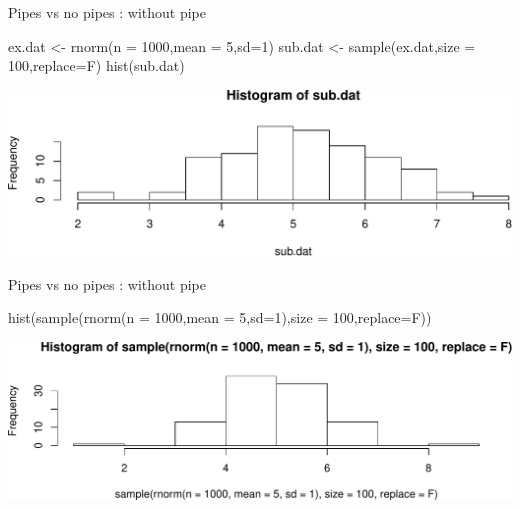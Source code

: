 \documentclass[14pt,ignorenonframetext,]{bredelebeamer}
\newenvironment{Shaded}{\begin{snugshade}}{\end{snugshade}}
\newcommand{\KeywordTok}[1]{\textcolor[rgb]{0.94,0.87,0.69}{#1}}
\newcommand{\DataTypeTok}[1]{\textcolor[rgb]{0.87,0.87,0.75}{#1}}
\newcommand{\DecValTok}[1]{\textcolor[rgb]{0.86,0.86,0.80}{#1}}
\newcommand{\StringTok}[1]{\textcolor[rgb]{0.80,0.58,0.58}{#1}}
\newcommand{\NormalTok}[1]{\textcolor[rgb]{0.80,0.80,0.80}{#1}}
\begin{document}
\begin{frame}[fragile]{Pipes vs no pipes : without pipe}

\begin{Shaded}
\begin{Highlighting}[]
\NormalTok{ex.dat <-}\StringTok{ }\KeywordTok{rnorm}\NormalTok{(}\DataTypeTok{n =} \DecValTok{1000}\NormalTok{,}\DataTypeTok{mean =} \DecValTok{5}\NormalTok{,}\DataTypeTok{sd=}\DecValTok{1}\NormalTok{)}
\NormalTok{sub.dat <-}\StringTok{ }\KeywordTok{sample}\NormalTok{(ex.dat,}\DataTypeTok{size =} \DecValTok{100}\NormalTok{,}\DataTypeTok{replace=}\NormalTok{F)}
\KeywordTok{hist}\NormalTok{(sub.dat)}
\end{Highlighting}
\end{Shaded}

\includegraphics{tidyverse_28_03_files/figure-beamer/histo1-1.pdf}

\end{frame}

\begin{frame}[fragile]{Pipes vs no pipes : without pipe}

\begin{Shaded}
\begin{Highlighting}[]
\KeywordTok{hist}\NormalTok{(}\KeywordTok{sample}\NormalTok{(}\KeywordTok{rnorm}\NormalTok{(}\DataTypeTok{n =} \DecValTok{1000}\NormalTok{,}\DataTypeTok{mean =} \DecValTok{5}\NormalTok{,}\DataTypeTok{sd=}\DecValTok{1}\NormalTok{),}\DataTypeTok{size =} \DecValTok{100}\NormalTok{,}\DataTypeTok{replace=}\NormalTok{F))}
\end{Highlighting}
\end{Shaded}

\includegraphics{tidyverse_28_03_files/figure-beamer/histo2-1.pdf}

\end{frame}
\end{document}
